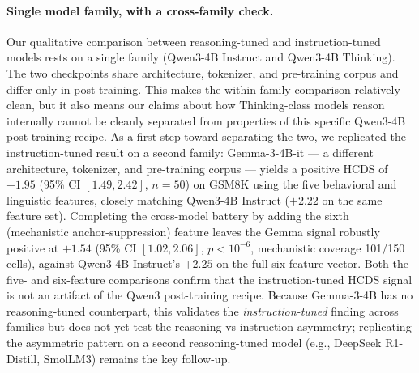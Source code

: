 \documentclass{article}
\theoremstyle{plain}
\theoremstyle{definition}
\theoremstyle{remark}
\begin{document}
\paragraph{Single model family, with a cross-family check.}
Our qualitative comparison between reasoning-tuned and instruction-tuned models rests on a single family (Qwen3-4B Instruct and Qwen3-4B Thinking). The two checkpoints share architecture, tokenizer, and pre-training corpus and differ only in post-training. This makes the within-family comparison relatively clean, but it also means our claims about how Thinking-class models reason internally cannot be cleanly separated from properties of this specific Qwen3-4B post-training recipe. As a first step toward separating the two, we replicated the instruction-tuned result on a second family: Gemma-3-4B-it --- a different architecture, tokenizer, and pre-training corpus --- yields a positive HCDS of $+1.95$ (95\% CI $[1.49, 2.42]$, $n=50$) on GSM8K using the five behavioral and linguistic features, closely matching Qwen3-4B Instruct ($+2.22$ on the same feature set). Completing the cross-model battery by adding the sixth (mechanistic anchor-suppression) feature leaves the Gemma signal robustly positive at $+1.54$ (95\% CI $[1.02, 2.06]$, $p < 10^{-6}$, mechanistic coverage 101/150 cells), against Qwen3-4B Instruct's $+2.25$ on the full six-feature vector. Both the five- and six-feature comparisons confirm that the instruction-tuned HCDS signal is not an artifact of the Qwen3 post-training recipe. Because Gemma-3-4B has no reasoning-tuned counterpart, this validates the \emph{instruction-tuned} finding across families but does not yet test the reasoning-vs-instruction asymmetry; replicating the asymmetric pattern on a second reasoning-tuned model (e.g., DeepSeek R1-Distill, SmolLM3) remains the key follow-up.
\end{document}
